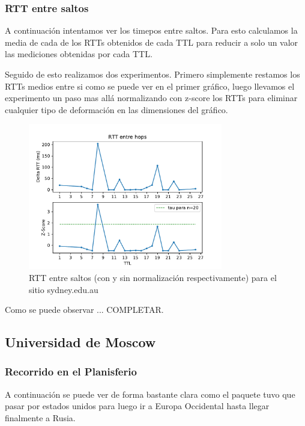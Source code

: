 \subsubsection*{RTT entre saltos}

A continuación intentamos ver los timepos entre saltos. Para esto calculamos la media de cada de los RTTs obtenidos de cada TTL para reducir a solo un valor las mediciones obtenidas por cada TTL. 

Seguido de esto realizamos dos experimentos. Primero simplemente restamos los RTTs medios entre si como se puede ver en el primer gráfico, luego llevamos el experimento un paso mas allá normalizando con z-score los RTTs para eliminar cualquier tipo de deformación en las dimensiones del gráfico.

\begin{figure}[H]
  \centering
  \includegraphics[width=8.5cm]{figs/traceroute-sidney.pdf}
  \caption{\normalfont RTT entre saltos (con y sin normalización respectivamente) para el sitio sydney.edu.au}
\end{figure}

Como se puede observar ... COMPLETAR.


\subsection*{Universidad de Moscow}

\subsubsection*{Recorrido en el Planisferio}

A continuación se puede ver de forma bastante clara como el paquete tuvo que pasar por estados unidos para luego ir a Europa Occidental hasta llegar finalmente a Rusia.

